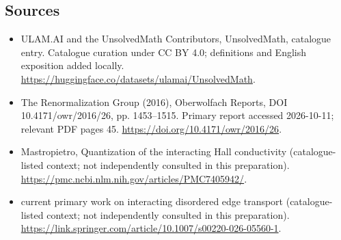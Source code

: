\documentclass[11pt]{article}
\begin{document}
\subsection{Sources}
\begin{itemize}
\item[\hypertarget{source:statement:1}{S1}] ULAM.AI and the UnsolvedMath Contributors, UnsolvedMath, catalogue entry. Catalogue curation under CC BY 4.0; definitions and English exposition added locally.
\url{https://huggingface.co/datasets/ulamai/UnsolvedMath}.
\item[\hypertarget{source:statement:2}{S2}] The Renormalization Group (2016), Oberwolfach Reports, DOI 10.4171/owr/2016/26, pp. 1453--1515. Primary report accessed 2026-10-11; relevant PDF pages 45.
\url{https://doi.org/10.4171/owr/2016/26}.
\item[\hypertarget{source:statement:3}{S3}] Mastropietro, Quantization of the interacting Hall conductivity (catalogue-listed context; not independently consulted in this preparation).
\url{https://pmc.ncbi.nlm.nih.gov/articles/PMC7405942/}.
\item[\hypertarget{source:statement:4}{S4}] current primary work on interacting disordered edge transport (catalogue-listed context; not independently consulted in this preparation).
\url{https://link.springer.com/article/10.1007/s00220-026-05560-1}.
\end{itemize}
\label{end:statement}
\end{document}
